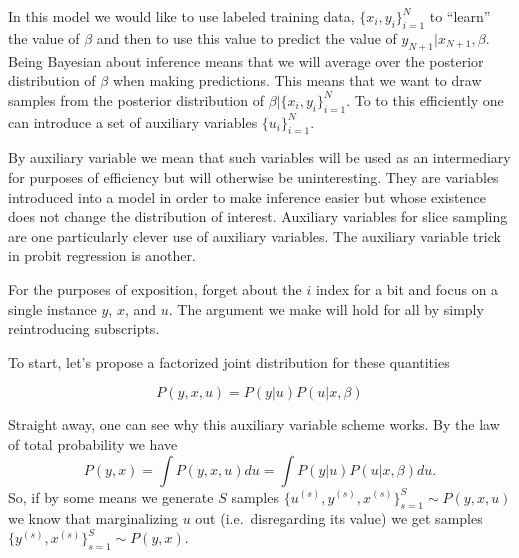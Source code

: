 In this model we would like to use labeled training data, $\{x_i, y_i\}_{i=1}^N$ to ``learn'' the value of $\beta$ and then to use this value to predict the value of $y_{N+1} | x_{N+1}, \beta.$  Being Bayesian about inference means that we will average over the posterior distribution of $\beta$ when making predictions.  This means that we want to draw samples from the posterior distribution of $\beta | \{x_i, y_i\}_{i=1}^N$.  To to this efficiently one can introduce a set of auxiliary variables $\{u_i\}_{i=1}^N$.  

By auxiliary variable we mean that such variables will be used as an intermediary for purposes of efficiency but will otherwise be uninteresting.    They are variables introduced into a model in order to make inference easier but whose existence does not change the distribution of interest.  Auxiliary variables for slice sampling are one particularly clever use of auxiliary variables.  The auxiliary variable trick in probit regression is another.

For the purposes of exposition, forget about the $i$ index for a bit and focus on a single instance $y$, $x$, and $u$.  The argument we make will hold for all by simply reintroducing subscripts.  

To start, let's propose a factorized joint distribution for these quantities

\begin{equation}
P(y,x,u) = P(y|u)P(u|x,\beta) \label{eqn:joint}
\end{equation}

Straight away, one can see why this auxiliary variable scheme works.  By the law of total probability we have
\begin{equation}
P(y,x) = \int P(y,x,u)du= \int P(y|u)P(u|x,\beta)du.  \label{eqn:joint_marginalized}
\end{equation}
So, if by some means we generate $S$ samples $\{u^{(s)},y^{(s)},x^{(s)}\}_{s=1}^S \sim P(y,x,u)$ we know that marginalizing $u$ out (i.e.~disregarding its value) we get samples $\{y^{(s)},x^{(s)}\}_{s=1}^S \sim P(y,x).$  %


